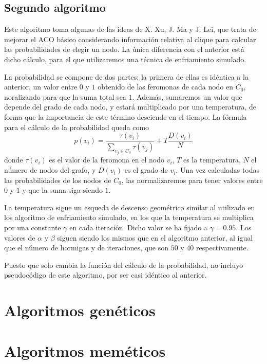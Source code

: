 \subsection{Segundo algoritmo}

Este algoritmo toma algunas de las ideas de X. Xu, J. Ma y J. Lei, que trata de mejorar el ACO básico considerando
información relativa al clique para calcular las probabilidades de elegir un nodo. La única diferencia con el anterior
está dicho cálculo, para el que utilizaremos una técnica de enfriamiento simulado.

La probabilidad se compone de dos partes: la primera de ellas es idéntica a la anterior, un valor entre $0$ y $1$
obtenido de las feromonas de cada nodo en $C_0$, noralizando para que la suma total sea $1$. Además, sumaremos un
valor que depende del grado de cada nodo, y estará multiplicado por una temperatura, de forma que la importancia
de este término desciende en el tiempo. La fórmula para el cálculo de la probabilidad queda como
\[ p(v_i) = \frac{\tau(v_i)}{\sum_{v_j \in C_0} \tau(v_j)} + T \frac{D(v_i)}{N} \]
donde $\tau(v_i)$ es el valor de la feromona en el nodo $v_i$, $T$ es la temperatura, $N$ el número de nodos
del grafo, y $D(v_i)$ es el grado de $v_i$. Una vez calculadas todas las probabilidades de los nodos de $C_0$,
las normalizaremos para tener valores entre $0$ y $1$ y que la suma siga siendo $1$.

La temperatura sigue un esqueda de descenso geométrico similar al utilizado en los algoritmo de enfriamiento simulado,
en los que la temperatura se multiplica por una constante $\gamma$ en cada iteración. Dicho valor se ha fijado a
$\gamma = 0.95$. Los valores de $\alpha$ y $\beta$ siguen siendo los mismos que en el algoritmo anterior, al igual
que el número de hormigas y de iteraciones, que son $50$ y $40$ respectivamente.

Puesto que solo cambia la función del cálculo de la probabilidad, no incluyo pseudocódigo de este algoritmo,
por ser casi idéntico al anterior.

\section{Algoritmos genéticos}


\section{Algoritmos meméticos}
